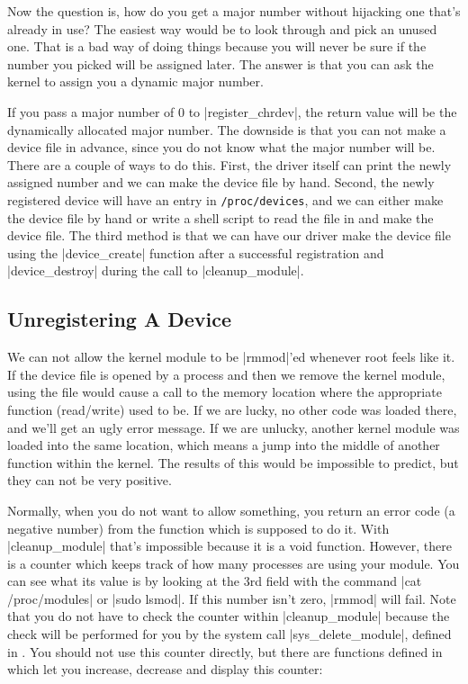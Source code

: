 \documentclass[10pt, oneside]{book}
\begin{document}
Now the question is, how do you get a major number without hijacking one that's already in use?
The easiest way would be to look through  and pick an unused one.
That is a bad way of doing things because you will never be sure if the number you picked will be assigned later.
The answer is that you can ask the kernel to assign you a dynamic major number.

If you pass a major number of 0 to \cpp|register_chrdev|, the return value will be the dynamically allocated major number.
The downside is that you can not make a device file in advance, since you do not know what the major number will be.
There are a couple of ways to do this.
First, the driver itself can print the newly assigned number and we can make the device file by hand.
Second, the newly registered device will have an entry in \verb|/proc/devices|, and we can either make the device file by hand or write a shell script to read the file in and make the device file.
The third method is that we can have our driver make the device file using the \cpp|device_create| function after a successful registration and \cpp|device_destroy| during the call to \cpp|cleanup_module|.

\subsection{Unregistering A Device}
\label{sec:unregister_device}
We can not allow the kernel module to be \sh|rmmod|'ed whenever root feels like it.
If the device file is opened by a process and then we remove the kernel module, using the file would cause a call to the memory location where the appropriate function (read/write) used to be.
If we are lucky, no other code was loaded there, and we'll get an ugly error message.
If we are unlucky, another kernel module was loaded into the same location, which means a jump into the middle of another function within the kernel.
The results of this would be impossible to predict, but they can not be very positive.

Normally, when you do not want to allow something, you return an error code (a negative number) from the function which is supposed to do it.
With \cpp|cleanup_module| that's impossible because it is a void function.
However, there is a counter which keeps track of how many processes are using your module.
You can see what its value is by looking at the 3rd field with the command \sh|cat /proc/modules| or \sh|sudo lsmod|.
If this number isn't zero, \sh|rmmod| will fail.
Note that you do not have to check the counter within \cpp|cleanup_module| because the check will be performed for you by the system call \cpp|sys_delete_module|, defined in .
You should not use this counter directly, but there are functions defined in  which let you increase, decrease and display this counter:
\end{document}

